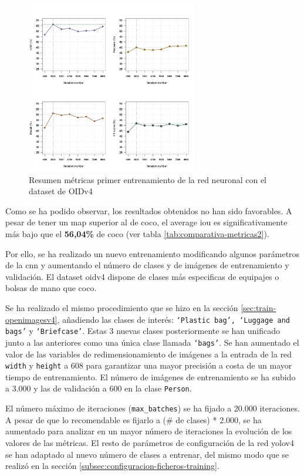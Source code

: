 \begin{figure}[ht]
\centering
\includegraphics[width=0.67\textwidth]{img/chapters/resultados/metricas/metrics-train1.png}
\caption{\label{fig:metrics-train1}Resumen métricas primer entrenamiento de la red neuronal con el dataset de OIDv4}
\end{figure}

Como se ha podido observar, los resultados obtenidos no han sido favorables. A pesar de tener un \gls{map} superior al de \gls{coco}, el average \gls{iou} es significativamente más bajo que el \textbf{56,04\%} de \gls{coco} (ver tabla \ref{tab:comparativa-metricas2}).

Por ello, se ha realizado un nuevo entrenamiento modificando algunos parámetros de la \gls{cnn} y aumentando el número de clases y de imágenes de entrenamiento y validación. El dataset \gls{oidv4} dispone de clases más especificas de equipajes o bolsas de mano que \gls{coco}.

Se ha realizado el mismo procedimiento que se hizo en la sección \ref{sec:train-openimagesv4}, añadiendo las clases de interés: \texttt{`Plastic bag', `Luggage and bags'} y \texttt{`Briefcase'}. Estas 3 nuevas clases posteriormente se han unificado junto a las anteriores como una única clase llamada \texttt{`bags'}. Se han aumentado el valor de las variables de redimensionamiento de imágenes a la entrada de la red \texttt{width} y \texttt{height} a 608 para garantizar una mayor precisión a costa de un mayor tiempo de entrenamiento. El número de imágenes de entrenamiento se ha subido a 3.000 y las de validación a 600 en la clase \texttt{Person}.

El número máximo de iteraciones (\texttt{max\_batches}) se ha fijado a 20.000 iteraciones. A pesar de que lo recomendable es fijarlo a (\# de clases) * 2.000, se ha aumentado para analizar en un mayor número de iteraciones la evolución de los valores de las métricas. El resto de parámetros de configuración de la red \gls{yolov4} se han adaptado al nuevo número de clases a entrenar, del mismo modo que se realizó en la sección \ref{subsec:configuracion-ficheros-training}.

